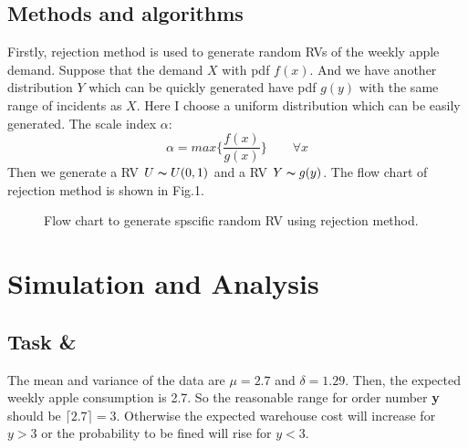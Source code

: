 \documentclass[letterpaper, 10 pt, conference]{ieeeconf}
\begin{document}
\subsection{Methods and algorithms}
Firstly, rejection method is used to generate random RVs of the weekly apple demand. Suppose that the demand $X$ with pdf $f(x)$. And we have another distribution $Y$ which can be quickly generated have pdf $g(y)$ with the same range of incidents as $X$. Here I choose a uniform distribution which can be easily generated. The scale index $\alpha$:
\begin{equation}
  \alpha = max\{\frac{f(x)}{g(x)}\} \qquad \forall x
\end{equation}
Then we generate a RV $U \thicksim U(0,1)$ and a RV $Y \thicksim g(y)$. The flow chart of rejection method is shown in Fig.1.
\begin{figure}[thpb]
   \centering
   \caption{Flow chart to generate spscific random RV using rejection method.}
\end{figure}

\section{Simulation and Analysis}
\subsection{Task \uppercase\expandafter{} \& \uppercase\expandafter{}}
The mean and variance of the data are $\mu = 2.7$ and $\delta = 1.29 $. Then, the expected weekly apple consumption is 2.7. So the reasonable range for order number \textbf{y} should be $\lceil 2.7 \rceil = 3$. Otherwise the expected warehouse cost will increase for $y>3$ or the probability to be fined will rise for $y<3$.
\end{document}
